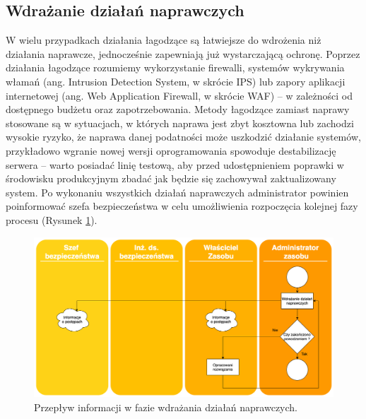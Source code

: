 \subsection{Wdrażanie działań naprawczych}
W wielu przypadkach działania łagodzące są łatwiejsze do wdrożenia niż działania naprawcze, jednocześnie zapewniają już wystarczającą ochronę. Poprzez działania łagodzące rozumiemy wykorzystanie firewalli, systemów wykrywania włamań (ang. Intrusion Detection System, w skrócie IPS) lub zapory aplikacji internetowej (ang. Web Application Firewall, w skrócie WAF) – w zależności od dostępnego budżetu oraz zapotrzebowania. Metody łagodzące zamiast naprawy stosowane są w sytuacjach, w których naprawa jest zbyt kosztowna lub zachodzi wysokie ryzyko, że naprawa danej podatności może uszkodzić działanie systemów, przykładowo wgranie nowej wersji oprogramowania spowoduje destabilizację serwera – warto posiadać linię testową, aby przed udostępnieniem poprawki w środowisku produkcyjnym zbadać jak będzie się zachowywał zaktualizowany system. Po wykonaniu wszystkich działań naprawczych administrator powinien poinformować szefa bezpieczeństwa w celu umożliwienia rozpoczęcia kolejnej fazy procesu (Rysunek \ref{fig:flow-fixing}).

\begin{figure}[!ht]
\centering
\includegraphics[width=.9\textwidth]{Chapters/Wstep/p-vm/flow-fixing.png}
\caption{Przepływ informacji w fazie wdrażania działań naprawczych.}
\label{fig:flow-fixing}
\end{figure}


